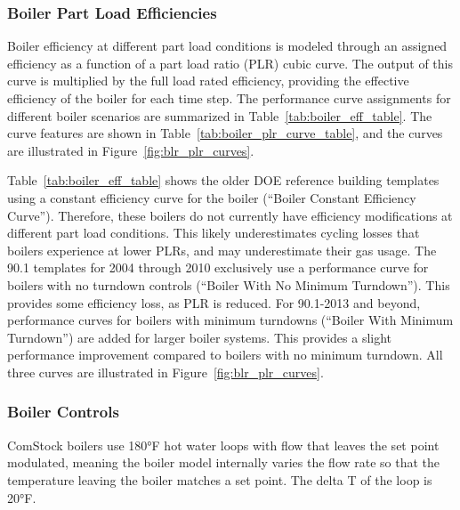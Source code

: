 \subsubsection{Boiler Part Load Efficiencies}
Boiler efficiency at different part load conditions is modeled through an assigned efficiency as a function of a part load ratio (PLR) cubic curve. The output of this curve is multiplied by the full load rated efficiency, providing the effective efficiency of the boiler for each time step. The performance curve assignments for different boiler scenarios are summarized in Table~\ref{tab:boiler_eff_table}. The curve features are shown in Table~\ref{tab:boiler_plr_curve_table}, and the curves are illustrated in Figure~\ref{fig:blr_plr_curves}. 

Table~\ref{tab:boiler_eff_table} shows the older DOE reference building templates using a constant efficiency curve for the boiler (``Boiler Constant Efficiency Curve''). Therefore, these boilers do not currently have efficiency modifications at different part load conditions. This likely underestimates cycling losses that boilers experience at lower PLRs, and may underestimate their gas usage. The 90.1 templates for 2004 through 2010 exclusively use a performance curve for boilers with no turndown controls (``Boiler With No Minimum Turndown''). This provides some efficiency loss, as PLR is reduced. For 90.1-2013 and beyond, performance curves for boilers with minimum turndowns (``Boiler With Minimum Turndown'') are added for larger boiler systems. This provides a slight performance improvement compared to boilers with no minimum turndown. All three curves are illustrated in Figure~\ref{fig:blr_plr_curves}.    




\subsubsection{Boiler Controls}

ComStock boilers use 180°F hot water loops with flow that leaves the set point modulated, meaning the boiler model internally varies the flow rate so that the temperature leaving the boiler matches a set point. The delta T of the loop is 20°F. %

